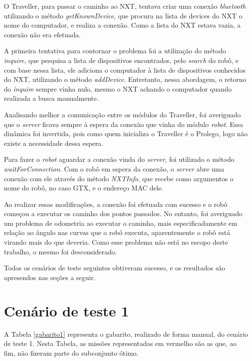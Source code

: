 	O Traveller, para passar o caminho ao NXT, tentava criar uma conexão \textit{bluetooth} utilizando o método \textit{getKnownDevice}, que procura na lista de devices do NXT o nome do computador, e realiza a conexão. Como a lista do NXT estava vazia, a conexão não era efetuada.

	A primeira tentativa para contornar o problema foi a utilização do método \textit{inquire}, que pesquisa a lista de dispositivos encontrados, pelo \textit{search} do robô, e com base nessa lista, ele adiciona o computador à lista de dispositivos conhecidos do NXT, utilizando o método \textit{addDevice}. Entretanto, nessa abordagem, o retorno do \textit{inquire} sempre vinha nulo, mesmo o NXT achando o computador quando realizada a busca manualmente.

	Analisando melhor a comunicação entre os módulos do Traveller, foi averiguado que o \textit{server} ficava sempre à espera da conexão que vinha do módulo \textit{robot}. Essa dinâmica foi invertida, pois como quem inicializa o Traveller é o Prolego, logo não existe a necessidade dessa espera. 

	Para fazer o \textit{robot} aguardar a conexão vinda do \textit{server}, foi utilizado o método \textit{waitForConnection}. Com o robô em espera da conexão, o \textit{server} abre uma conexão com ele através do método \textit{NXTInfo}, que recebe como argumentos o nome do robô, no caso GTX, e o endereço MAC dele.

	Ao realizar essas modificações, a conexão foi efetuada com sucesso e o robô começou a executar os caminho dos pontos passados. No entanto, foi averiguado um problema de odometria ao executar o caminho, mais especificadamente em relação ao ângulo nas curvas que o robô executa, aparentemente o robô está virando mais do que deveria. Como esse problema não está no escopo deste trabalho, o mesmo foi desconsiderado.
	
	Todos os cenários de teste seguintes obtiveram sucesso, e os resultados são apresendos nas seções a seguir.
	
	

\section{Cenário de teste 1}

A Tabela \ref{gabarito1} representa o gabarito, realizado de forma manual, do cenário de teste 1. Nesta Tabela, as missões representadas em vermelho são as que, ao fim, não fizeram parte do subconjunto ótimo.

